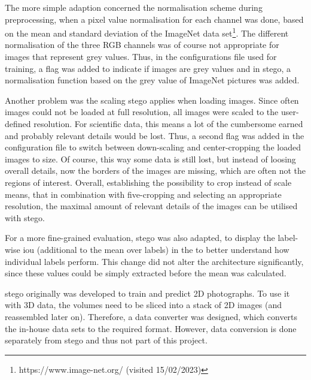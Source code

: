 The more simple adaption concerned the normalisation scheme during preprocessing, when a pixel value normalisation for each channel was done, based on the mean and standard deviation of the ImageNet data set\footnote{https://www.image-net.org/ (visited 15/02/2023)}.
The different normalisation of the three RGB channels was of course not appropriate for images that represent grey values.
Thus, in the configurations file used for training, a flag was added to indicate if images are grey values and in \gls{stego}, a normalisation function based on the grey value of ImageNet pictures was added.

Another problem was the scaling \gls{stego} applies when loading images.
Since often images could not be loaded at full resolution, all images were scaled to the user-defined resolution.
For scientific data, this means a lot of the cumbersome earned and probably relevant details would be lost.
Thus, a second flag was added in the configuration file to switch between down-scaling and center-cropping the loaded images to size.
Of course, this way some data is still lost, but instead of loosing overall details, now the borders of the images are missing, which are often not the regions of interest.
Overall, establishing the possibility to crop instead of scale means, that in combination with five-cropping and selecting an appropriate resolution, the maximal amount of relevant details of the images can be utilised with \gls{stego}.

For a more fine-grained evaluation, \gls{stego} was also adapted, to display the label-wise \gls{iou} (additional to the mean over labels) in the \tensorboard to better understand how individual labels perform.
This change did not alter the architecture significantly, since these values could be simply extracted before the mean was calculated.


\gls{stego} originally was developed to train and predict 2D photographs.
To use it with 3D data, the volumes need to be sliced into a stack of 2D images (and reassembled later on).
Therefore, a data converter was designed, which converts the in-house data sets to the required format.
However, data conversion is done separately from \gls{stego} and thus not part of this project.

